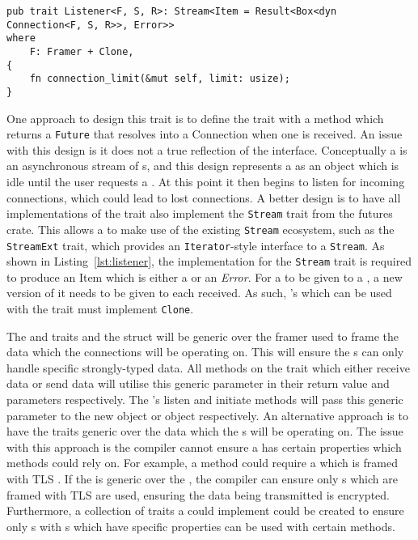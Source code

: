 \begin{lstlisting}[float=h, label=lst:listener, caption={The Listener trait, showing the Stream
implementation requirement for all implementers.}]
pub trait Listener<F, S, R>: Stream<Item = Result<Box<dyn Connection<F, S, R>>, Error>>
where
    F: Framer + Clone,
{
    fn connection_limit(&mut self, limit: usize);
}

\end{lstlisting}
One approach to design this trait is to define the trait with a method which returns a \texttt{Future} that resolves
into a Connection when one is received.
An issue with this design is it does not a true reflection of the \listener{} interface.
Conceptually a \listener{} is an asynchronous stream of \connection{}s, and this design represents a
\listener{} as an object which is idle until the user requests a \connection{}.
At this point it then begins to listen for incoming connections, which could lead to lost connections.
A better design is to have all implementations of the \listener{} trait also implement the \texttt{Stream} trait
from the futures crate.
This allows a \listener{} to make use of the existing \texttt{Stream} ecosystem, such as the \texttt{StreamExt}
trait, which provides an \texttt{Iterator}-style interface to a \texttt{Stream}.
As shown in Listing~\ref{lst:listener}, the implementation for the \texttt{Stream} trait is required to produce an Item
which is either a \connection{} or an \emph{Error}.
For a \framer{} to be given to a \listener{}, a new version of it needs to be given to each \connection{}
received.
As such, \framer{}'s which can be used with the \listener{} trait must implement \texttt{Clone}.

The \connection{} and \listener{} traits and the \preconnection{} struct will be generic over the framer
used to frame the data which the connections will be operating on.
This will ensure the \connection{}s can only handle specific strongly-typed data.
All methods on the \connection{} trait which either receive data or send data will utilise this generic parameter in
their return value and parameters respectively.
The \preconnection{}'s listen and initiate methods will pass this generic parameter to the new \listener{}
object or \connection{} object respectively.
An alternative approach is to have the traits generic over the data which the \connection{}s will be operating on.
The issue with this approach is the compiler cannot ensure a \connection{} has certain properties which methods
could rely on.
For example, a method could require a \connection{} which is framed with TLS .
If the \connection{} is generic over the \framer{}, the compiler can ensure only \connection{}s which are
framed with TLS are used, ensuring the data being transmitted is encrypted.
Furthermore, a collection of traits a \framer{} could implement could be created to ensure only \connection{}s
with \framer{}s which have specific properties can be used with certain methods.

